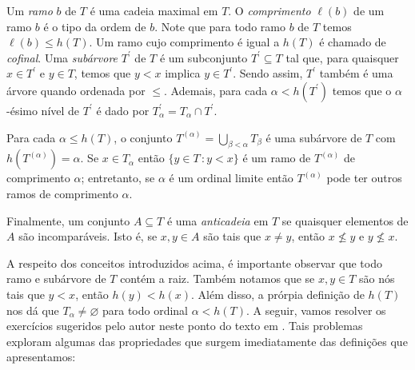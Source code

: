 \documentclass[a4paper]{article}
\theoremstyle{plain}\newtheorem{teo}{Teorema}[section]
\theoremstyle{plain}\newtheorem{prop}[teo]{Proposição}
\theoremstyle{plain}\newtheorem{lem}[teo]{Lema}
\theoremstyle{plain}\newtheorem{cor}[teo]{Corolário}
\theoremstyle{definition}\newtheorem{defi}[teo]{Definição}
\theoremstyle{remark}\newtheorem{rem}[teo]{Observação}
\theoremstyle{definition}\newtheorem{example}[teo]{Exemplo}
\theoremstyle{remark}\newtheorem{step}{\bf Step}
\begin{document}
Um \emph{ramo} \(b\) de \(T\) é uma cadeia maximal em \(T\).  O \emph{comprimento}
\(\ell(b)\) de um ramo \(b\) é o tipo da ordem de \(b\). Note que para
todo ramo \(b\) de \(T\) temos \(\ell (b)\leq h(T)\).
Um ramo cujo comprimento é igual a \(h(T)\) é chamado de \emph{cofinal}.
Uma \emph{subárvore} \(T^\prime\) de \(T\) é um subconjunto
\(T^\prime\subseteq T\) tal que, para quaisquer \(x\in T^\prime\) e \(y\in T\),
temos que \(y<x\) implica \(y\in T^\prime\).
Sendo assim, \(T^\prime\) também é uma árvore quando ordenada por \(\leq\).
Ademais, para cada \(\alpha < h(T^\prime)\) temos que o \(\alpha\)-ésimo nível
de \(T^\prime\) é dado por \(T_\alpha^\prime= T_\alpha \cap T^\prime\).

 Para cada \(\alpha\leq h(T)\), o conjunto \(T^{(\alpha)}=\bigcup_{\beta <
   \alpha} T_\beta\) é uma subárvore de \(T\) com  \(h(T^{(\alpha)})=\alpha\).
 Se \(x\in T_\alpha\) então \(\{y\in T\,\colon y < x\}\) é um ramo de \(T^{(\alpha)}\) de
comprimento \(\alpha\); entretanto, se \(\alpha\) é um ordinal limite então
\(T^{(\alpha)}\) pode ter outros ramos de comprimento \(\alpha\).

Finalmente, um conjunto \(A\subseteq T\) é uma \emph{anticadeia} em \(T\) se
quaisquer elementos de \(A\) são incomparáveis. Isto é, se \(x,y\in A\) são tais
que \(x\not = y\), então \(x\not \leq y\) e \(y\not \leq x\).

A respeito dos conceitos introduzidos acima, é importante observar que todo
ramo e subárvore de \(T\) contém a raiz. Também notamos que se \(x,y\in T\)
são nós tais que \(y< x\), então \(h(y) <h(x)\). Além disso, a prórpia definição
de \(h(T)\) nos dá que \(T_\alpha\not=\varnothing\) para todo ordinal
\(\alpha<h(T)\). A seguir, vamos resolver os
exercícios sugeridos pelo autor neste ponto do texto em \cite{jech}. Tais problemas
exploram algumas das propriedades que surgem imediatamente das
definições que apresentamos:
\end{document}
